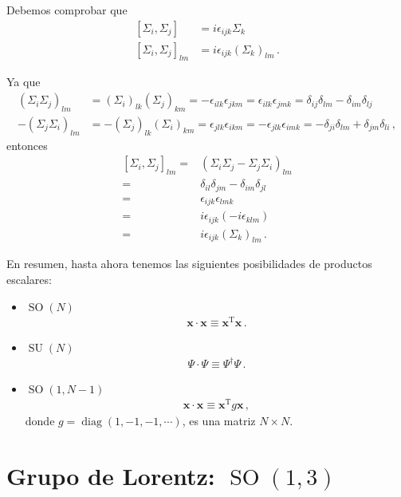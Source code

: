 Debemos comprobar que
\begin{align}
  \left[{\Sigma_i},{\Sigma_j}\right]&=i\epsilon_{ijk}{\Sigma_k}\nonumber\\
  \left[{\Sigma_i},{\Sigma_j}\right]_{lm}&=i\epsilon_{ijk}(\Sigma_k)_{lm}\,.
\end{align}

Ya que
\begin{align}
  \label{eq:167}
  (\Sigma_i\Sigma_j)_{lm}&=(\Sigma_i)_{lk}(\Sigma_j)_{km}=-\epsilon_{ilk}\epsilon_{jkm}=\epsilon_{ilk}\epsilon_{jmk}=\delta_{ij}\delta_{lm}-\delta_{im}\delta_{lj}\nonumber\\
  -(\Sigma_j\Sigma_i)_{lm}&=-(\Sigma_j)_{lk}(\Sigma_i)_{km}=\epsilon_{jlk}\epsilon_{ikm}=-\epsilon_{jlk}\epsilon_{imk}=-\delta_{ji}\delta_{lm}+\delta_{jm}\delta_{li}\,,
\end{align}
entonces
\begin{align}
\label{eq:adjrepsu2}
[\Sigma_i,\Sigma_j]_{lm}=& (\Sigma_i\Sigma_j-\Sigma_j\Sigma_i)_{lm}\nonumber\\
=&\delta_{il}\delta_{jm}-\delta_{im}\delta_{jl}\nonumber\\
=&\epsilon_{ijk}\epsilon_{lmk}\nonumber\\
=&i\epsilon_{ijk}(-i\epsilon_{klm})\nonumber\\
=&i\epsilon_{ijk}(\Sigma_k)_{lm}\,.
\end{align}

En resumen, hasta ahora tenemos las siguientes posibilidades de productos escalares:
\begin{itemize}
\item $\operatorname{SO}(N)$
  \begin{align}
     \boldsymbol{x}\cdot \boldsymbol{x}\equiv \boldsymbol{x}^{\operatorname{T}} \boldsymbol{x}\,.
  \end{align}
\item $\operatorname{SU}(N)$
  \begin{align}
     \Psi\cdot\Psi\equiv\Psi^{\dagger}\Psi\,. 
  \end{align}
\item $\operatorname{SO}(1,N-1)$
  \begin{align}
     \boldsymbol{x}\cdot \boldsymbol{x}\equiv \boldsymbol{x}^{\operatorname{T}}g \boldsymbol{x}\,,
  \end{align}
donde $g=\operatorname{diag}(1,-1,-1,\cdots)$, es una matriz $N\times N$.
\end{itemize}


\section{Grupo de Lorentz: $\operatorname{SO}(1,3)$}
\label{sec:glso13}

